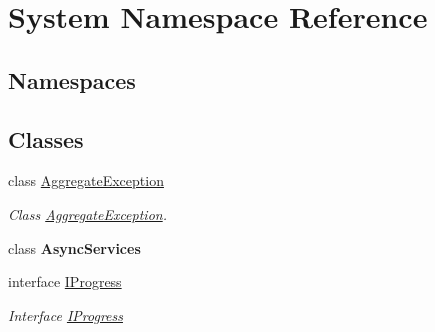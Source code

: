 \hypertarget{namespace_system}{}\section{System Namespace Reference}
\label{namespace_system}
\subsection*{Namespaces}
\begin{DoxyCompactItemize}
\end{DoxyCompactItemize}
\subsection*{Classes}
\begin{DoxyCompactItemize}
\item 
class \hyperlink{class_system_1_1_aggregate_exception}{Aggregate\+Exception}
\begin{DoxyCompactList}\small\item\em Class \hyperlink{class_system_1_1_aggregate_exception}{Aggregate\+Exception}. \end{DoxyCompactList}\item 
class {\bfseries Async\+Services}
\item 
interface \hyperlink{interface_system_1_1_i_progress}{I\+Progress}
\begin{DoxyCompactList}\small\item\em Interface \hyperlink{interface_system_1_1_i_progress}{I\+Progress} \end{DoxyCompactList}\end{DoxyCompactItemize}
